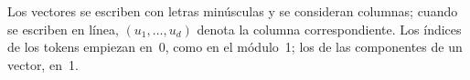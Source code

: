 \documentclass[11pt,a4paper,twoside,openany]{book}
\begin{document}
Los vectores se escriben con letras minúsculas y se consideran columnas; cuando se escriben en línea, $(u_1,\dots,u_d)$ denota la columna correspondiente. Los índices de los tokens empiezan en~0, como en el módulo~1; los de las componentes de un vector, en~1.

\tableofcontents

\mainmatter






\appendix


\backmatter

\end{document}
